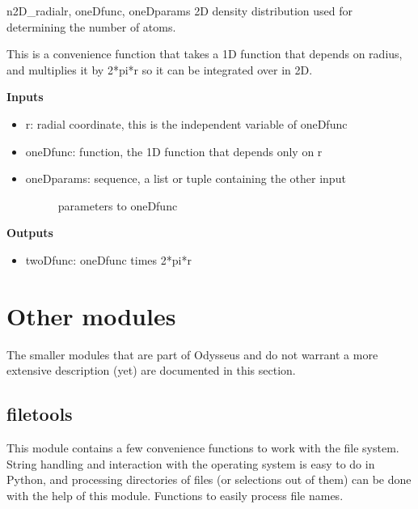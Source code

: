 \documentclass[letterpaper,10pt,english]{manual}
\begin{document}
\hypertarget{fitfuncs.n2D_radial}{}\begin{funcdesc}{n2D\_radial}{r, oneDfunc, oneDparams}
2D density distribution used for determining the number of atoms.

This is a convenience function that takes a 1D function that depends on
radius, and multiplies it by 2*pi*r so it can be integrated over in 2D.

\textbf{Inputs}
\begin{itemize}
\item {} 
r: radial coordinate, this is the independent variable of oneDfunc

\item {} 
oneDfunc: function, the 1D function that depends only on r

\item {} \begin{description}
\item[oneDparams: sequence, a list or tuple containing the other input]
parameters to oneDfunc

\end{description}

\end{itemize}

\textbf{Outputs}
\begin{itemize}
\item {} 
twoDfunc: oneDfunc times 2*pi*r

\end{itemize}
\end{funcdesc}

\resetcurrentobjects


\section{Other modules}

The smaller modules that are part of Odysseus and do not warrant a more extensive description (yet) are documented in this section.


\subsection{filetools}

This module contains a few convenience functions to work with the file system. String handling and interaction with the operating system is easy to do in Python, and processing directories of files (or selections out of them) can be done with the help of this module.
\modulesynopsis{}
Functions to easily process file names.
\end{document}
